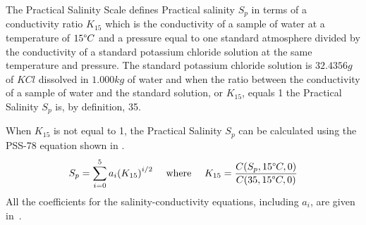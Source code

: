 The Practical Salinity Scale defines Practical salinity $S_p$ in terms of a conductivity ratio $K_{15}$ which is the conductivity of a sample of water at a temperature of $15\degree C$ and a pressure equal to one standard atmosphere divided by the conductivity of a standard potassium chloride solution at the same temperature and pressure.
The standard potassium chloride solution is $32.4356g$ of $KCl$ dissolved in $1.000kg$ of water and when the ratio between the conductivity of a sample of water and the standard solution, or $K_{15}$, equals 1 the Practical Salinity $S_p$ is, by definition, 35.

When $K_{15}$ is not equal to 1, the Practical Salinity $S_p$ can be calculated using the PSS-78 equation shown in .
\begin{equation}\label{eq:pss-78-k15}
    S_p = \sum_{i=0}^{5} a_i {(K_{15})}^{i/2}~~~~\text{where}~~~~K_{15} = \frac{C(S_p, 15\degree C, 0)}{C(35, 15\degree C, 0)}
\end{equation}
All the coefficients for the salinity-conductivity equations, including $a_i$, are given in~.


